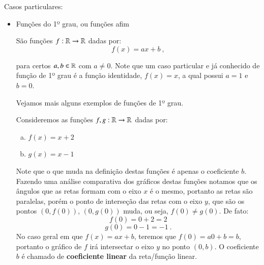  Casos particulares:
 \begin{itemize}
 \item Funções do 1º grau, ou funções afim

 São funções $f: \mathbb{R} \rightarrow \mathbb{R}$ dadas por:
 \[f(x)= ax + b \ , \]

 para certos $a, b \in \mathbb{R}$ com $a \neq 0$. Note que um caso particular e já conhecido de função de 1º grau é a função identidade, $f(x)= x$, a qual possui $a=1$ e $b=0$. 
 
 Vejamos mais alguns exemplos de funções de 1º grau.
 
 Consideremos as funções $f, g: \mathbb{R} \to \mathbb{R}$ dadas por:
 \begin{enumerate}[a)]
  \item $f(x)= x+2$
  \item $g(x)= x-1$
 \end{enumerate}

 
 \begin{figure}[H]
  \end{figure} 
  Note que o que muda na definição destas funções é apenas o coeficiente $b$. Fazendo uma análise comparativa dos gráficos destas funções notamos que os ângulos que as retas formam com o eixo $x$ é o mesmo, portanto as retas são paralelas, porém o ponto de interseção das retas com o eixo $y$, que são os pontos $(0, f(0))$, $(0, g(0))$ muda, ou seja, $f(0) \neq g(0)$. De fato:
  \[f(0)= 0 + 2= 2\]
  \[g(0)= 0 -1 = -1 \ .\]
  No caso geral em que $f(x)=ax+b$, teremos que $f(0)=a0 + b= b$, portanto o gráfico de $f$ irá intersectar o eixo $y$ no ponto $(0,b)$. O coeficiente $b$ é chamado de \textbf{coeficiente linear} da reta/função linear.
  

\end{itemize}
